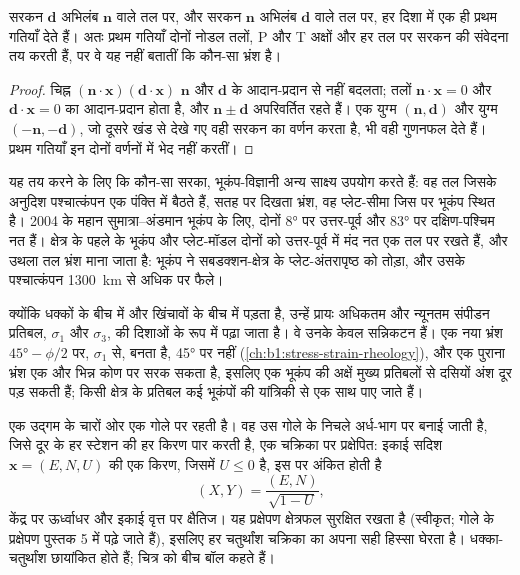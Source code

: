 \begin{proposition}[दो नोडल तल]
\label{prop:b1:earthquake-source:auxiliary}
सरकन $\mathbf d$ अभिलंब $\mathbf n$ वाले तल पर, और सरकन $\mathbf n$ अभिलंब $\mathbf d$ वाले तल पर, हर दिशा में एक ही प्रथम गतियाँ देते हैं। अतः प्रथम गतियाँ दोनों नोडल तलों, P और T अक्षों और हर तल पर सरकन की संवेदना तय करती हैं, पर वे यह नहीं बतातीं कि कौन-सा  भ्रंश है।
\end{proposition}

\begin{proof}
चिह्न $(\mathbf n\cdot\mathbf x)(\mathbf d\cdot\mathbf x)$ $\mathbf n$ और $\mathbf d$ के आदान-प्रदान से नहीं बदलता; तलों $\mathbf n\cdot\mathbf x = 0$ और $\mathbf d\cdot\mathbf x = 0$ का आदान-प्रदान होता है, और $\mathbf n \pm \mathbf d$ अपरिवर्तित रहते हैं। एक युग्म $(\mathbf n, \mathbf d)$ और युग्म $(-\mathbf n, -\mathbf d)$, जो दूसरे खंड से देखे गए वही सरकन का वर्णन करता है, भी वही गुणनफल देते हैं। प्रथम गतियाँ इन दोनों वर्णनों में भेद नहीं करतीं।
\end{proof}

यह तय करने के लिए कि कौन-सा  सरका, भूकंप-विज्ञानी अन्य साक्ष्य उपयोग करते हैं: वह तल जिसके अनुदिश पश्चात्कंपन एक पंक्ति में बैठते हैं, सतह पर दिखता भ्रंश, वह प्लेट-सीमा जिस पर भूकंप स्थित है। 2004 के महान सुमात्रा–अंडमान भूकंप के लिए, दोनों  \ang{8} पर उत्तर-पूर्व और \ang{83} पर दक्षिण-पश्चिम नत हैं। क्षेत्र के पहले के भूकंप और प्लेट-मॉडल दोनों  को उत्तर-पूर्व में मंद नत एक तल पर रखते हैं, और उथला तल भ्रंश माना जाता है: भूकंप ने सबडक्शन-क्षेत्र के प्लेट-अंतरापृष्ठ को तोड़ा, और उसके पश्चात्कंपन \qty{1300}{km} से अधिक पर फैले।

क्योंकि  धक्कों के बीच में और  खिंचावों के बीच में पड़ता है, उन्हें प्रायः अधिकतम और न्यूनतम संपीडन प्रतिबल, $\sigma_1$ और $\sigma_3$, की दिशाओं के रूप में पढ़ा जाता है। वे उनके केवल सन्निकटन हैं। एक नया भ्रंश $\ang{45} - \phi/2$ पर, $\sigma_1$ से, बनता है, \ang{45} पर नहीं (\cref{ch:b1:stress-strain-rheology}), और एक पुराना भ्रंश एक और भिन्न कोण पर सरक सकता है, इसलिए एक भूकंप की अक्षें मुख्य प्रतिबलों से दसियों अंश दूर पड़ सकती हैं; किसी क्षेत्र के प्रतिबल कई भूकंपों की यांत्रिकी से एक साथ पाए जाते हैं।

एक  उद्गम के चारों ओर एक गोले पर रहती है। वह उस गोले के निचले अर्ध-भाग पर बनाई जाती है, जिसे दूर के हर स्टेशन की हर किरण पार करती है, एक चक्रिका पर प्रक्षेपित: इकाई सदिश $\mathbf x = (E, N, U)$ की एक किरण, जिसमें $U \le 0$ है, इस पर अंकित होती है
\[
  (X, Y) = \frac{(E, N)}{\sqrt{1 - U}} ,
\]
केंद्र पर ऊर्ध्वाधर और इकाई वृत्त पर क्षैतिज। यह प्रक्षेपण क्षेत्रफल सुरक्षित रखता है (स्वीकृत; गोले के प्रक्षेपण पुस्तक 5 में पढ़े जाते हैं), इसलिए हर चतुर्थांश चक्रिका का अपना सही हिस्सा घेरता है। धक्का-चतुर्थांश छायांकित होते हैं; चित्र को बीच बॉल कहते हैं।

